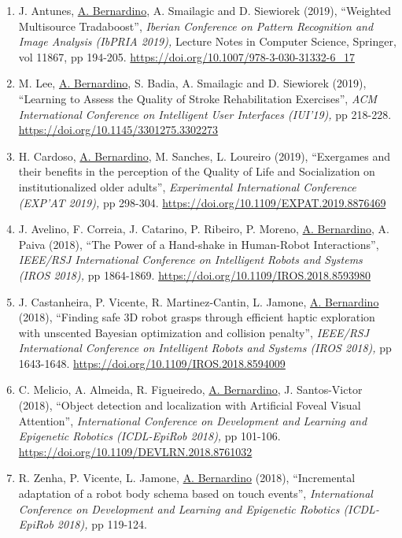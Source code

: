 \begin{enumerate}
{  2019),} pp 48-53. \url{https://doi.org/10.1109/DEVLRN.2019.8850710}~
\item
  J. Antunes, \ul{A. Bernardino}, A. Smailagic and D. Siewiorek (2019),
  ``Weighted Multisource Tradaboost'', \emph{Iberian Conference on
  Pattern Recognition and Image Analysis (IbPRIA 2019),} Lecture Notes
  in Computer Science, Springer, vol 11867, pp 194-205.
  \url{https://doi.org/10.1007/978-3-030-31332-6_17}~
\item
  M. Lee, \ul{A. Bernardino}, S. Badia, A. Smailagic and D. Siewiorek
  (2019), ``Learning to Assess the Quality of Stroke Rehabilitation
  Exercises'', \emph{ACM International Conference on Intelligent User
  Interfaces (IUI'19),} pp 218-228.
  \url{https://doi.org/10.1145/3301275.3302273}~
\item
  H. Cardoso, \ul{A. Bernardino}, M. Sanches, L. Loureiro (2019),
  ``Exergames and their benefits in the perception of the Quality of
  Life and Socialization on institutionalized older adults'',
  \emph{Experimental International Conference (EXP'AT 2019),} pp
  298-304. \url{https://doi.org/10.1109/EXPAT.2019.8876469}~
\item
  J. Avelino, F. Correia, J. Catarino, P. Ribeiro, P. Moreno, \ul{A.
  Bernardino}, A. Paiva (2018), ``The Power of a Hand-shake in
  Human-Robot Interactions'', \emph{IEEE/RSJ International Conference on
  Intelligent Robots and Systems (IROS 2018),} pp 1864-1869.
  \url{https://doi.org/10.1109/IROS.2018.8593980}~
\item
  J. Castanheira, P. Vicente, R. Martinez-Cantin, L. Jamone, \ul{A.
  Bernardino} (2018), ``Finding safe 3D robot grasps through efficient
  haptic exploration with unscented Bayesian optimization and collision
  penalty'', \emph{IEEE/RSJ International Conference on Intelligent
  Robots and Systems (IROS 2018),} pp 1643-1648.
  \url{https://doi.org/10.1109/IROS.2018.8594009}~
\item
  C. Melicio, A. Almeida, R. Figueiredo, \ul{A. Bernardino}, J.
  Santos-Victor (2018), ``Object detection and localization with
  Artificial Foveal Visual Attention'', \emph{International Conference
  on Development and Learning and Epigenetic Robotics (ICDL-EpiRob
  2018),} pp 101-106. \url{https://doi.org/10.1109/DEVLRN.2018.8761032}~
\item
  R. Zenha, P. Vicente, L. Jamone, \ul{A. Bernardino} (2018),
  ``Incremental adaptation of a robot body schema based on touch
  events'', \emph{International Conference on Development and Learning
  and Epigenetic Robotics (ICDL-EpiRob 2018),} pp 119-124.

\end{enumerate}
